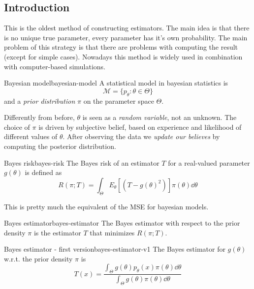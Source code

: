 \documentclass[12pt]{extarticle}
\begin{document}
\subsection{Introduction}

This is the oldest method of constructing estimators.
The main idea is that there is no unique true parameter, every parameter has it's own probability.
The main problem of this strategy is that there are problems with computing the result (except for simple cases).
Nowadays this method is widely used in combination with computer-based simulations.

\begin{definition}{Bayesian model}{bayesian-model}
    A statistical model in bayesian statistics is
    \begin{equation}
        \mathcal M = \{ p_\theta : \theta \in \Theta \}
    \end{equation}
    and a \emph{prior distribution} $\pi$ on the parameter space $\Theta$.
\end{definition}

Differently from before, $\theta$ is seen as a \emph{random variable}, not an unknown.
The choice of $\pi$ is driven by subjective belief, based on experience and likelihood of different values of $\theta$.
After observing the data we \emph{update our believes} by computing the posterior distribution.

\begin{definition}{Bayes risk}{bayes-risk}
    The Bayes risk of an estimator $T$ for a real-valued parameter $g(\theta)$ is defined as
    \begin{equation}
        R(\pi; T) = \int_\Theta E_\theta[(T-g(\theta)^2)] \pi(\theta) \dd{\theta}
    \end{equation}
\end{definition}
This is pretty much the equivalent of the MSE for bayesian models.

\begin{definition}{Bayes estimator}{bayes-estimator}
    The Bayes estimator with respect to the prior density $\pi$ is the estimator $T$ that minimizes $R(\pi; T)$.
\end{definition}

\begin{theorem}{Bayes estimator - first version}{bayes-estimator-v1}
    The Bayes estimator for $g(\theta)$ w.r.t. the prior density $\pi$ is
    \begin{equation}
        T(x) = \frac{\int_\Theta g(\theta) p_\theta(x)\pi(\theta) \dd{\theta}}{\int_\Theta g(\theta) \pi(\theta) \dd{\theta}}
    \end{equation}
\end{theorem}
\end{document}
